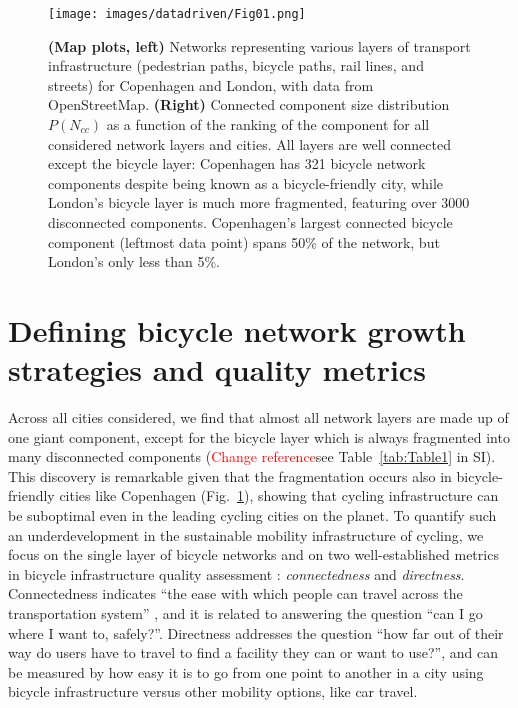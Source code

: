 \begin{figure}[htbp]
  \centering
  \texttt{[image: images/datadriven/Fig01.png]}
  \caption[Multimodal configuration]{\textbf{(Map plots, left)} Networks representing various layers of transport infrastructure (pedestrian paths, bicycle paths, rail lines, and streets) for Copenhagen and London, with data from OpenStreetMap. \textbf{(Right)} Connected component size distribution $P(N_{cc})$ as a function of the ranking of the component for all considered network layers and cities. All layers are well connected except the bicycle layer: Copenhagen has 321 bicycle network components despite being known as a bicycle-friendly city, while London's bicycle layer is much more fragmented, featuring over 3000 disconnected components. Copenhagen's largest connected bicycle component (leftmost data point) spans 50\% of the network, but London's only less than 5\%.}
  \label{fig:Multimodal}
\end{figure}

\section{Defining bicycle network growth strategies and quality metrics}
Across all cities considered, we find that almost all network layers are made up of one giant component, except for the bicycle layer which is always fragmented into many disconnected components (\textcolor{red}{Change reference}see Table~\ref{tab:Table1} in SI). This discovery is remarkable given that the fragmentation occurs also in bicycle-friendly cities like Copenhagen (Fig.~\ref{fig:Multimodal}), showing that cycling infrastructure can be suboptimal even in the leading cycling cities on the planet. To quantify such an underdevelopment in the sustainable mobility infrastructure of cycling, we focus on the single layer of bicycle networks and on two well-established metrics in bicycle infrastructure quality assessment \cite{Krizek2005Discontinuities,movement2013Cycling,Dobrovolny2014Pedestrian,Twaddell2018Multimodal,Beck2019Space}: \textit{connectedness} and \textit{directness}. Connectedness indicates ``the ease with which people can travel across the transportation system'' \cite{Twaddell2018Multimodal}, and it is related to answering the question ``can I go where I want to, safely?''. Directness addresses the question ``how far out of their way do users have to travel to find a facility they can or want to use?'', and can be measured by how easy it is to go from one point to another in a city using bicycle infrastructure versus other mobility options, like car travel.

